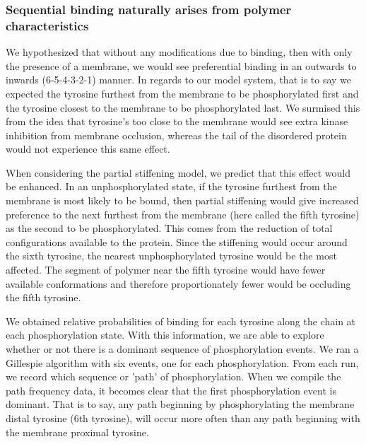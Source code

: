 \documentclass[../../AdvancementSummary.tex]{subfiles}
\begin{document}
\subsubsection{Sequential binding naturally arises from polymer characteristics}

We hypothesized that without any modifications due to binding, then with only the presence of a membrane, we would see preferential binding in an outwards to inwards (6-5-4-3-2-1) manner.  In regards to our model system, that is to say we expected the tyrosine furthest from the membrane to be phosphorylated first and the tyrosine closest to the membrane to be phosphorylated last.  We surmised this from the idea that tyrosine's too close to the membrane would see extra kinase inhibition from membrane occlusion, whereas the tail of the disordered protein would not experience this same effect. 

When considering the partial stiffening model, we predict that this effect would be enhanced.  In an unphosphorylated state, if the tyrosine furthest from the membrane is most likely to be bound, then partial stiffening would give increased preference to the next furthest from the membrane (here called the fifth tyrosine) as the second to be phosphorylated.  This comes from the reduction of total configurations available to the protein.  Since the stiffening would occur around the sixth tyrosine, the nearest unphosphorylated tyrosine would be the most affected.  The segment of polymer near the fifth tyrosine would have fewer available conformations and therefore proportionately fewer would be occluding the fifth tyrosine.

We obtained relative probabilities of binding for each tyrosine along the chain at each phosphorylation state.  With this information, we are able to explore whether or not there is a dominant sequence of phosphorylation events. We ran a Gillespie algorithm with six events, one for each phosphorylation.  From each run, we record which sequence or 'path' of phosphorylation.  When we compile the path frequency data, it becomes clear that the first phosphorylation event is dominant.  That is to say, any path beginning by phosphorylating the membrane distal tyrosine (6th tyrosine), will occur more often than any path beginning with the membrane proximal tyrosine. 
\end{document}
